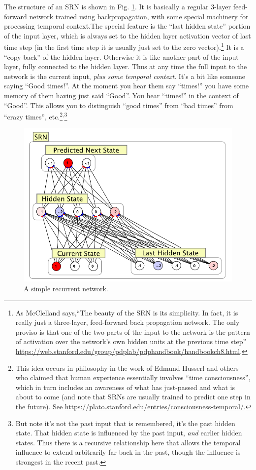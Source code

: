 The structure of an SRN is shown in Fig. \ref{SRN_Structure}. It is basically a regular 3-layer feed-forward network trained using backpropagation, with some special machinery for processing temporal context.The special feature is the ``last hidden state'' portion of the input layer, which is always set to the hidden layer activation vector of last time step (in the first time step it is usually just set to the  zero vector).\footnote{ As McClelland says,``The beauty of the SRN is its simplicity. In fact, it is really just a three-layer, feed-forward back propagation network. The only proviso is that one of the two parts of the input to the network is the pattern of activation over the network's own hidden units at the previous time step'' \url{ https://web.stanford.edu/group/pdplab/pdphandbook/handbookch8.html}.} It is a ``copy-back'' of the hidden  layer. Otherwise it is like another part of the input layer, fully connected to the hidden layer. Thus at any time the full input to the network is the current input, \emph{plus some temporal context}. It's a bit like  someone saying ``Good times!''. At the moment you hear them say ``times!'' you have some memory of them having just said ``Good''. You  hear ``times!'' in the context of ``Good''. This allows you to distinguish ``good times'' from ``bad times'' from ``crazy times'', etc.\footnote{This idea occurs in philosophy in the work of Edmund Husserl and others who claimed that human experience essentially involves ``time consciousness'', which in turn includes an awareness of what has just-passed and what is about to come (and note that SRNs are usually trained to predict one step in the future). See \url{https://plato.stanford.edu/entries/consciousness-temporal/}.}$^,$\footnote{But note it's not the past input that is remembered, it's the past  hidden state. That hidden state is influenced by the past  input, \emph{and} earlier hidden states. Thus there is a recursive relationship here that allows the temporal influence to extend arbitrarily far back in the past, though the influence is strongest in the recent past.}

\begin{figure}[h]
\centering
\includegraphics[scale=.6]{./images/srn.png}
\caption[Simbrain screenshot.]{A simple recurrent network.}
\label{SRN_Structure}
\end{figure}


